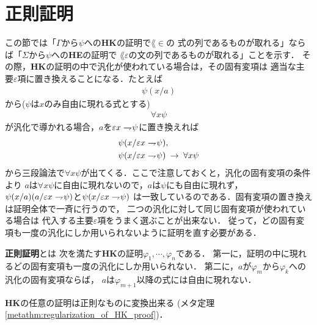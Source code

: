 \section{正則証明}
\label{sec:regular_proof}
	この節では「$\Gamma$から$\psi$への{\bf HK}の証明で$\lang{\in}$の
	式の列であるものが取れる」ならば「$\Sigma$から$\psi$への{\bf HE}の証明で
	$\lang{\varepsilon}$の文の列であるものが取れる」ことを示す．
	その際，{\bf HK}の証明の中で汎化が使われている場合は，その固有変項は
	適当な主要$\varepsilon$項に置き換えることになる．たとえば
	\begin{align}
		\psi(x/a)
	\end{align}
	から($\psi$は$x$のみ自由に現れる式とする)
	\begin{align}
		\forall x \psi
	\end{align}
	が汎化で導かれる場合，$a$を$\varepsilon x \rightharpoondown\hspace{-0.25em} \psi$に置き換えれば
	\begin{align}
		&\psi(x/\varepsilon x \rightharpoondown\hspace{-0.25em} \psi), \\
		&\psi(x/\varepsilon x \rightharpoondown\hspace{-0.25em} \psi) \hspace{0.25em}\rightarrow\hspace{0.25em} \forall x \psi
	\end{align}
	から三段論法で$\forall x \psi$が出てくる．ここで注意しておくと，汎化の固有変項の条件より
	$a$は$\forall x \psi$に自由に現れないので，$a$は$\psi$にも自由に現れず，
	$\psi(x/a)(a/\varepsilon x \rightharpoondown\hspace{-0.25em} \psi)$と$\psi(x/\varepsilon x \rightharpoondown\hspace{-0.25em} \psi)$
	は一致しているのである．固有変項の置き換えは証明全体で一斉に行うので，
	二つの汎化に対して同じ固有変項が使われている場合は
	代入する主要$\varepsilon$項をうまく選ぶことが出来ない．
	従って，どの固有変項も一度の汎化にしか用いられないように証明を直す必要がある．
	
	\begin{screen}
		\begin{metadfn}[正則証明]
			{\bf 正則証明}とは
			次を満たす{\bf HK}の証明$\varphi_{1},\cdots,\varphi_{n}$である．
			第一に，証明の中に現れるどの固有変項も一度の汎化にしか用いられない．
			第二に，$a$が$\varphi_{m}$から$\varphi_{k}$への汎化の固有変項ならば，
			$a$は$\varphi_{m+1}$以降の式には自由に現れない．
		\end{metadfn}
	\end{screen}
	
	{\bf HK}の任意の証明は正則なものに変換出来る
	(メタ定理\ref{metathm:regularization_of_HK_proof})．
	
